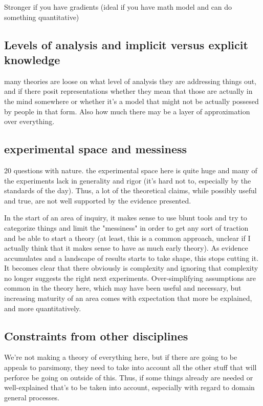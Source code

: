 \documentclass[]{article}
\begin{document}
Stronger if you have gradients (ideal if you have math model and can do something quantitative)

\subsection{ Levels of analysis and implicit versus explicit knowledge}
many theories are loose on what level of analysis they are addressing things out, and if there posit representations whether they mean that those are actually in the mind somewhere or whether it's a model that might not be actually possesed by people in that form. Also how much there may be a layer of approximation over everything. 

\subsection{experimental space and messiness}
20 	questions with nature. 
the experimental space here is quite huge and many of the experiments lack in generality and rigor (it's hard not to, especially by the standards of the day). Thus, a lot of the theoretical claims, while possibly useful and true, are not well supported by the evidence presented. 

In the start of an area of inquiry, it makes sense to use blunt tools and try to categorize things and limit the "messiness" in order to get any sort of traction and be able to start a theory (at least, this is a common approach, unclear if I actually think that it makes sense to have as much early theory). As evidence accumulates and a landscape of results starts to take shape, this stops cutting it. It becomes clear that there obviously is complexity and ignoring that complexity no longer suggests the right next experiments. Over-simplifying assumptions are common in the theory here, which may have been useful and necessary, but increasing maturity of an area comes with expectation that more be explained, and more quantitatively. 

\subsection{Constraints from other disciplines}
We're not making a theory of everything here, but if there are going to be appeals to parsimony, they need to take into account all the other stuff that will perforce be going on outside of this. Thus, if some things already are needed or well-explained that's to be  taken into account, especially with regard to domain general processes. 
\end{document}

